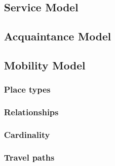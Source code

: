 \documentclass[a4paper,11pt]{report}
\begin{document}
  
  \subsection{Service Model}
  
  
  \subsection{Acquaintance Model}
  
  
  \subsection{Mobility Model}
  

  \subsubsection{Place types}
  
  \subsubsection{Relationships}
  
  \subsubsection{Cardinality}
  
  \subsubsection{Travel paths}
  
\end{document}
